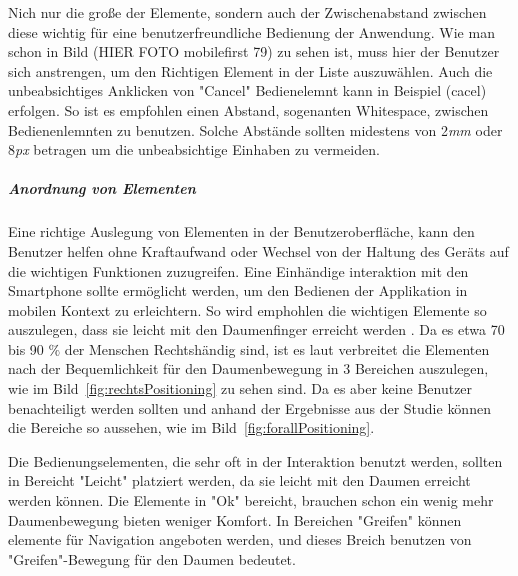 Nich nur die große der Elemente, sondern auch der Zwischenabstand zwischen diese wichtig für eine benutzerfreundliche Bedienung der Anwendung. Wie man schon in Bild (HIER FOTO mobilefirst 79) zu sehen ist, muss hier der Benutzer sich anstrengen, um den Richtigen Element in der Liste auszuwählen. Auch die unbeabsichtiges Anklicken von "Cancel" Bedienelemnt kann in Beispiel (cacel) erfolgen. So ist es empfohlen einen Abstand, sogenanten Whitespace, zwischen Bedienenlemnten zu benutzen. Solche Abstände sollten midestens von 2\textit{mm} oder 8\textit{px} betragen\cite{lukeGUI} um die unbeabsichtige Einhaben zu vermeiden.

\subparagraph{Anordnung von Elementen} 
\label{subp:anordnung_von_elementen}

Eine richtige Auslegung von Elementen in der Benutzeroberfläche, kann den Benutzer helfen ohne Kraftaufwand oder Wechsel von der Haltung des Geräts auf die wichtigen Funktionen zuzugreifen. Eine Einhändige interaktion mit den Smartphone sollte ermöglicht werden, um den Bedienen der Applikation in mobilen Kontext zu erleichtern. So wird emphohlen die wichtigen Elemente so auszulegen, dass sie leicht mit den Daumenfinger erreicht werden \cite[Seite 209]{mobileFrontier}. Da es etwa 70 bis 90 $\%$ der Menschen Rechtshändig sind, ist es laut \cite[Seite 72]{mobileFirst} verbreitet die Elementen  nach der Bequemlichkeit für den Daumenbewegung in 3 Bereichen auszulegen, wie im Bild~\ref{fig:rechtsPositioning} zu sehen sind. Da es aber keine Benutzer benachteiligt werden sollten und anhand der Ergebnisse aus der Studie \cite{Park:2010tu} können die Bereiche so aussehen, wie im Bild~\ref{fig:forallPositioning}\cite[Seite 72]{mobileFirst}.

Die Bedienungselementen, die sehr oft in der Interaktion benutzt werden, sollten in Bereicht "Leicht" platziert werden, da sie leicht mit den Daumen erreicht werden können. Die Elemente in "Ok" bereicht, brauchen schon ein wenig mehr Daumenbewegung bieten weniger Komfort. In Bereichen "Greifen" können elemente für Navigation angeboten werden, und dieses Breich benutzen von "Greifen"-Bewegung für den Daumen bedeutet.

